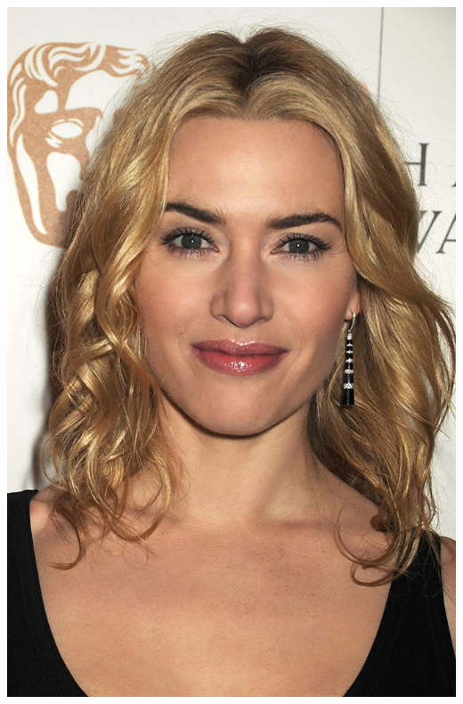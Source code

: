 \documentclass{article}
\begin{document}
\begin{center}
\begin{multicols}{2}
\includegraphics[scale=0.07]{intro2.jpeg}  
\end{multicols}
\end{center}
\vspace*{0.2in}
\end{document}
